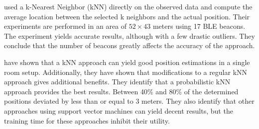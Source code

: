 \citeauthor{improving_indoor_localization} \cite{improving_indoor_localization} used a k-Nearest Neighbor (kNN) directly on the observed data and compute the average location between the selected k neighbors and the actual position. 
Their experiments are performed in an area of $52\times43$ meters using 17 BLE beacons.
The experiment yields accurate results, although with a few drastic outliers. 
They conclude that the number of beacons greatly affects the accuracy of the approach.

\citeauthor{ble_kneares_neural}\cite{ble_kneares_neural} have shown that a kNN approach can yield good position estimations in a single room setup. 
Additionally, they have shown that modifications to a regular kNN approach gives additional benefits. 
They identify that a probabilistic kNN approach provides the best results. 
Between 40\% and 80\% of the determined positions deviated by less than or equal to 3 meters. 
They also identify that other approaches using support vector machines can yield decent results, but the training time for these approaches inhibit their utility.